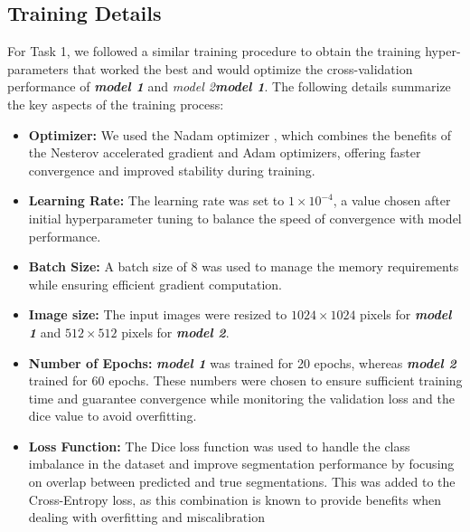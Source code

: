\subsection{Training  Details}

For Task 1, we followed a similar training procedure to obtain the training hyper-parameters that worked the best and would optimize the cross-validation performance of \textbf{\textit{model 1}} and \textit{model 2\textbf{model 1}}. The following details summarize the key aspects of the training process:

\begin{itemize}
\item \textbf{Optimizer:} We used the Nadam optimizer \cite{dozat2016}, which combines the benefits of the Nesterov accelerated gradient and Adam optimizers, offering faster convergence and improved stability during training.
    
\item \textbf{Learning Rate:} The learning rate was set to \(1 \times 10^{-4}\), a value chosen after initial hyperparameter tuning to balance the speed of convergence with model performance.
    
\item \textbf{Batch Size:} A batch size of 8 was used to manage the memory requirements while ensuring efficient gradient computation.
    
\item \textbf{Image size:} The input images were resized to \(1024 \times 1024\) pixels for \textbf{\textit{model 1}} and \(512 \times 512\) pixels for \textbf{\textit{model 2}}.
    
\item \textbf{Number of Epochs:} \textbf{\textit{model 1}} was trained for 20 epochs, whereas \textbf{\textit{model 2}} trained for 60 epochs. 
These numbers were chosen to ensure sufficient training time and guarantee convergence while monitoring the validation loss and the dice value to avoid overfitting.
    
\item \textbf{Loss Function:} The Dice loss function was used to handle the class imbalance in the dataset and improve segmentation performance by focusing on overlap between predicted and true segmentations. 
This was added to the Cross-Entropy loss, as this combination is known to provide benefits when dealing with overfitting and miscalibration %
\end{itemize}

